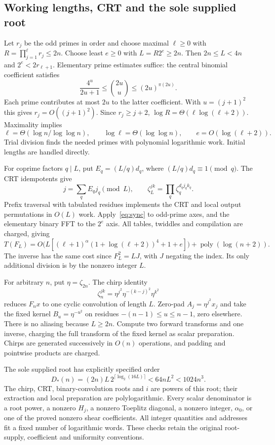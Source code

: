 \documentclass[11pt]{amsart}
\theoremstyle{remark}
\begin{document}
\subsection{Working lengths, CRT and the sole supplied root}
Let $r_j$ be the odd primes in order and choose maximal $\ell\ge0$
with $R=\prod_{j=1}^\ell r_j\le2n$. Choose least $e\ge0$ with
$L=R2^e\ge2n$. Then $2n\le L<4n$ and $2^e<2r_{\ell+1}$.
Elementary prime estimates suffice: the central binomial coefficient
satisfies
\[
 \frac{4^u}{2u+1}\le \binom{2u}{u}\le(2u)^{\pi(2u)}.
\]
Each prime contributes at most $2u$ to the latter coefficient. With
$u=(j+1)^2$ this gives $r_j=O((j+1)^2)$. Since $r_j\ge j+2$,
$\log R=\Theta(\ell\log(\ell+2))$. Maximality implies
\[
 \ell=\Theta(\log n/\log\log n),\qquad
 \log\ell=\Theta(\log\log n),\qquad e=O(\log(\ell+2)).
\]
Trial division finds the needed primes with polynomial logarithmic
work. Initial lengths are handled directly.

For coprime factors $q\mid L$, put $E_q=(L/q)d_q$, where
$(L/q)d_q\equiv1\pmod q$. The CRT idempotents give
\[
 j=\sum_qE_qj_q\pmod L,\qquad
 \zeta_L^{jk}=\prod_q\zeta_q^{d_qj_qk_q}.
\]
Prefix traversal with tabulated residues implements the CRT and local
output permutations in $O(L)$ work. Apply~\eqref{eq:sync} to odd-prime
axes, and the elementary binary FFT to the $2^e$ axis. All tables,
twiddles and compilation are charged, giving
\[
 T(F_L)=O\bigl(L[(\ell+1)^\alpha(1+\log(\ell+2))^4+1+e]\bigr)
                       +\operatorname{poly}(\log(n+2)).
\]
The inverse has the same cost since $F_L^2=LJ$, with $J$ negating
the index. Its only additional division is by the nonzero integer $L$.

For arbitrary $n$, put $\eta=\zeta_{2n}$. The chirp identity
\[
 \zeta_n^{jk}=\eta^{j^2}\eta^{-(k-j)^2}\eta^{k^2}
\]
reduces $F_nx$ to one cyclic convolution of length $L$. Zero-pad
$A_j=\eta^{j^2}x_j$ and take the fixed kernel
$B_u=\eta^{-u^2}$ on residues $-(n-1)\le u\le n-1$, zero elsewhere.
There is no aliasing because $L\ge2n$. Compute two forward transforms
and one inverse, charging the full transform of the fixed kernel as
scalar preparation. Chirps are generated successively in $O(n)$
operations, and padding and pointwise products are charged.

The sole supplied root has explicitly specified order
\begin{equation}\label{eq:root}
 D_*(n)=(2n)L\,2^{\lceil\log_2(16L)\rceil}
            <64nL^2<1024n^3.
\end{equation}
The chirp, CRT, binary-convolution roots and $i$ are powers of this
root; their extraction and local preparation are polylogarithmic.
Every scalar denominator is a root power, a nonzero $H_j$, a nonzero
Toeplitz diagonal, a nonzero integer, $\alpha_0$, or one of the proved
nonzero shear coefficients. All integer quantities and addresses fit
a fixed number of logarithmic words. These checks retain the original
root-supply, coefficient and uniformity conventions.
\end{document}
